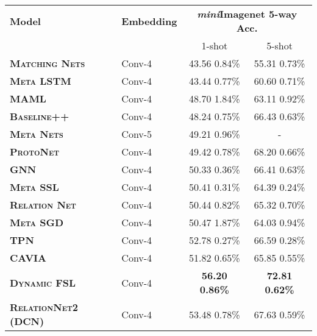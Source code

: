 \documentclass[conference]{IEEEtran}
\def\modelnameshort{DCN}
\begin{document}
\setlength{\tabcolsep}{4.8pt}
\begin{table}[t]
\centering
\footnotesize
\begin{tabular}{@{} llcc @{}}
\toprule
\multirow{2}{*}{\bf Model}  &\multirow{2}{*}{\bf Embedding} &\multicolumn{2}{c}{\multirow{2}{*}{\bf \textit{mini}Imagenet 5-way Acc.}}\\
& \multicolumn{2}{c}{}  \\
&& 1-shot & 5-shot \\
\midrule 

\textbf{\textsc{Matching} \textsc{Nets}} \cite{vinyals2016matching} &Conv-4 & 43.56  0.84\% &55.31  0.73\%  \\ 
\textbf{\textsc{Meta} \textsc{LSTM}} \cite{ravi2017optimization} &Conv-4  &43.44  0.77\% & 60.60  0.71\% \\ 
\textbf{\textsc{MAML}} \cite{finn2017model} & Conv-4 &  48.70  1.84\% & 63.11  0.92\% \\ 
\textbf{\textsc{Baseline++}} \cite{chen2019closerfewshot} & Conv-4 &  48.24  0.75\% & 66.43  0.63\% \\ 
\textbf{\textsc{Meta} \textsc{Nets}} \cite{munkhdalai2017meta} & Conv-5 &49.21  0.96\% & - \\
\textbf{\textsc{ProtoNet}} \cite{snell2017prototypical} & Conv-4 &49.42  0.78\% &68.20  0.66\%  \\ 
\textbf{\textsc{GNN}} \cite{garcia2017few} & Conv-4 & 50.33  0.36\% & 66.41  0.63\% \\ 
\textbf{\textsc{Meta SSL}}\cite{ren2018meta}&  Conv-4 &50.41  0.31\% & 64.39  0.24\% \\ 
\textbf{\textsc{Relation} \textsc{Net}} \cite{yang2018learning}& Conv-4 & 50.44  0.82\% &65.32  0.70\% \\ 
\textbf{\textsc{Meta SGD}} \cite{li2017meta}  & Conv-4 & 50.47  1.87\% & 64.03  0.94\% \\ 
\textbf{\textsc{TPN}} \cite{liu2018transductive} & Conv-4 & 52.78  0.27\% & 66.59  0.28\% \\ 
\textbf{\textsc{CAVIA}} \cite{zintgraf2018cavia} & Conv-4 & 51.82  0.65\% & 65.85  0.55\%\\
\textbf{\textsc{Dynamic FSL}} \cite{gidaris2018dynamic} & Conv-4 & \textbf{56.20  0.86\%} & \textbf{72.81  0.62\%}\\
\textbf{\textsc{RelationNet2 (\modelnameshort{})}} & Conv-4 & {53.48  0.78\%} & {67.63  0.59\%} \\ 


\end{tabular}
\end{table}
\end{document}
